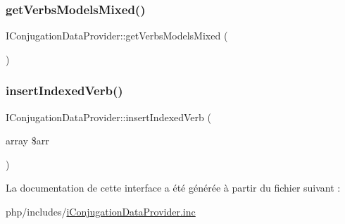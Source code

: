 \hypertarget{interface_i_conjugation_data_provider_aa30e7166c6d8e812482d6e420e05cc6c}{}\label{interface_i_conjugation_data_provider_aa30e7166c6d8e812482d6e420e05cc6c} 
\subsubsection{\texorpdfstring{get\+Verbs\+Models\+Mixed()}{getVerbsModelsMixed()}}
{\footnotesize\ttfamily I\+Conjugation\+Data\+Provider\+::get\+Verbs\+Models\+Mixed (\begin{DoxyParamCaption}{ }\end{DoxyParamCaption})}

\hypertarget{interface_i_conjugation_data_provider_ac37a4f6f2def34dea3f008dce50bf41d}{}\label{interface_i_conjugation_data_provider_ac37a4f6f2def34dea3f008dce50bf41d} 
\subsubsection{\texorpdfstring{insert\+Indexed\+Verb()}{insertIndexedVerb()}}
{\footnotesize\ttfamily I\+Conjugation\+Data\+Provider\+::insert\+Indexed\+Verb (\begin{DoxyParamCaption}\item[{array}]{\$arr }\end{DoxyParamCaption})}



La documentation de cette interface a été générée à partir du fichier suivant \+:\begin{DoxyCompactItemize}
\item 
php/includes/\hyperlink{i_conjugation_data_provider_8inc}{i\+Conjugation\+Data\+Provider.\+inc}\end{DoxyCompactItemize}
